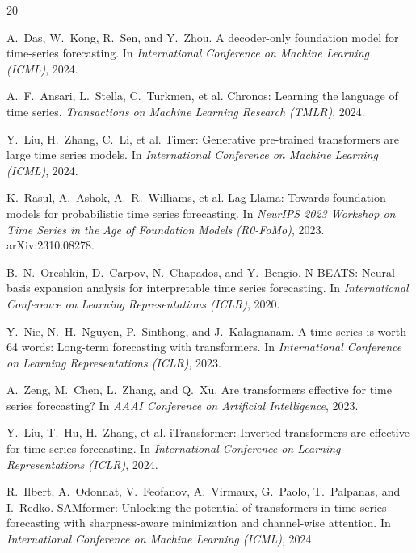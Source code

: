 \documentclass[11pt]{article}
\begin{document}
\begin{thebibliography}{20}

A.~Das, W.~Kong, R.~Sen, and Y.~Zhou.
\newblock A decoder-only foundation model for time-series forecasting.
\newblock In \emph{International Conference on Machine Learning (ICML)}, 2024.

A.~F.~Ansari, L.~Stella, C.~Turkmen, et al.
\newblock Chronos: Learning the language of time series.
\newblock \emph{Transactions on Machine Learning Research (TMLR)}, 2024.

Y.~Liu, H.~Zhang, C.~Li, et al.
\newblock Timer: Generative pre-trained transformers are large time series models.
\newblock In \emph{International Conference on Machine Learning (ICML)}, 2024.

K.~Rasul, A.~Ashok, A.~R.~Williams, et al.
\newblock Lag-Llama: Towards foundation models for probabilistic time series forecasting.
\newblock In \emph{NeurIPS 2023 Workshop on Time Series in the Age of Foundation Models (R0-FoMo)}, 2023. arXiv:2310.08278.

B.~N.~Oreshkin, D.~Carpov, N.~Chapados, and Y.~Bengio.
\newblock N-BEATS: Neural basis expansion analysis for interpretable time series forecasting.
\newblock In \emph{International Conference on Learning Representations (ICLR)}, 2020.

Y.~Nie, N.~H.~Nguyen, P.~Sinthong, and J.~Kalagnanam.
\newblock A time series is worth 64 words: Long-term forecasting with transformers.
\newblock In \emph{International Conference on Learning Representations (ICLR)}, 2023.

A.~Zeng, M.~Chen, L.~Zhang, and Q.~Xu.
\newblock Are transformers effective for time series forecasting?
\newblock In \emph{AAAI Conference on Artificial Intelligence}, 2023.

Y.~Liu, T.~Hu, H.~Zhang, et al.
\newblock iTransformer: Inverted transformers are effective for time series forecasting.
\newblock In \emph{International Conference on Learning Representations (ICLR)}, 2024.

R.~Ilbert, A.~Odonnat, V.~Feofanov, A.~Virmaux, G.~Paolo, T.~Palpanas, and I.~Redko.
\newblock SAMformer: Unlocking the potential of transformers in time series forecasting with sharpness-aware minimization and channel-wise attention.
\newblock In \emph{International Conference on Machine Learning (ICML)}, 2024.


\end{thebibliography}
\end{document}
